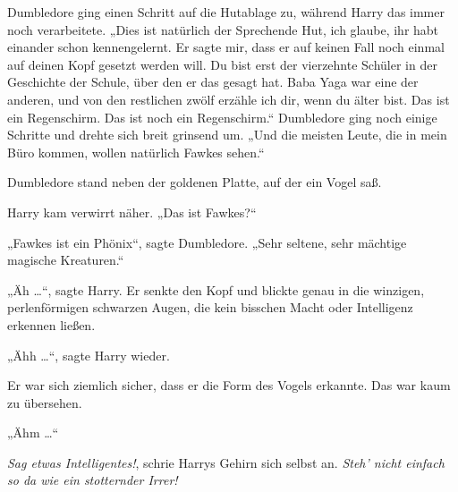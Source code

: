 Dumbledore ging einen Schritt auf die Hutablage zu, während Harry das immer noch verarbeitete.
„Dies ist natürlich der Sprechende Hut, ich glaube, ihr habt einander schon kennengelernt. Er sagte mir, dass er auf keinen Fall noch einmal auf deinen Kopf gesetzt werden will. Du bist erst der vierzehnte Schüler in der Geschichte der Schule, über den er das gesagt hat. Baba Yaga war eine der anderen, und von den restlichen zwölf erzähle ich dir, wenn du älter bist. Das ist ein Regenschirm. Das ist noch ein Regenschirm.“ Dumbledore ging noch einige Schritte und drehte sich breit grinsend um.
„Und die meisten Leute, die in mein Büro kommen, wollen natürlich Fawkes sehen.“

Dumbledore stand neben der goldenen Platte, auf der ein Vogel saß.

Harry kam verwirrt näher.
„Das ist Fawkes?“

„Fawkes ist ein Phönix“, sagte Dumbledore.
„Sehr seltene, sehr mächtige magische Kreaturen.“

„Äh …“, sagte Harry. Er senkte den Kopf und blickte genau in die winzigen, perlenförmigen schwarzen Augen, die kein bisschen Macht oder Intelligenz erkennen ließen.

„Ähh …“, sagte Harry wieder.

Er war sich ziemlich sicher, dass er die Form des Vogels erkannte. Das war kaum zu übersehen.

„Ähm …“

\emph{Sag etwas Intelligentes!}, schrie Harrys Gehirn sich selbst an. \emph{Steh’ nicht einfach so da wie ein stotternder Irrer!}

